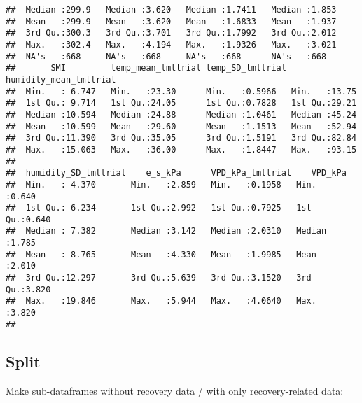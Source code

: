 \documentclass[
]{article}
\begin{document}
\begin{verbatim}
##  Median :299.9   Median :3.620   Median :1.7411   Median :1.853  
##  Mean   :299.9   Mean   :3.620   Mean   :1.6833   Mean   :1.937  
##  3rd Qu.:300.3   3rd Qu.:3.701   3rd Qu.:1.7992   3rd Qu.:2.012  
##  Max.   :302.4   Max.   :4.194   Max.   :1.9326   Max.   :3.021  
##  NA's   :668     NA's   :668     NA's   :668      NA's   :668    
##       SMI         temp_mean_tmttrial temp_SD_tmttrial humidity_mean_tmttrial
##  Min.   : 6.747   Min.   :23.30      Min.   :0.5966   Min.   :13.75         
##  1st Qu.: 9.714   1st Qu.:24.05      1st Qu.:0.7828   1st Qu.:29.21         
##  Median :10.594   Median :24.88      Median :1.0461   Median :45.24         
##  Mean   :10.599   Mean   :29.60      Mean   :1.1513   Mean   :52.94         
##  3rd Qu.:11.390   3rd Qu.:35.05      3rd Qu.:1.5191   3rd Qu.:82.84         
##  Max.   :15.063   Max.   :36.00      Max.   :1.8447   Max.   :93.15         
##                                                                             
##  humidity_SD_tmttrial    e_s_kPa      VPD_kPa_tmttrial    VPD_kPa     
##  Min.   : 4.370       Min.   :2.859   Min.   :0.1958   Min.   :0.640  
##  1st Qu.: 6.234       1st Qu.:2.992   1st Qu.:0.7925   1st Qu.:0.640  
##  Median : 7.382       Median :3.142   Median :2.0310   Median :1.785  
##  Mean   : 8.765       Mean   :4.330   Mean   :1.9985   Mean   :2.010  
##  3rd Qu.:12.297       3rd Qu.:5.639   3rd Qu.:3.1520   3rd Qu.:3.820  
##  Max.   :19.846       Max.   :5.944   Max.   :4.0640   Max.   :3.820  
## 
\end{verbatim}

\hypertarget{split}{%
\subsection{Split}\label{split}}

Make sub-dataframes without recovery data / with only recovery-related
data:
\end{document}
